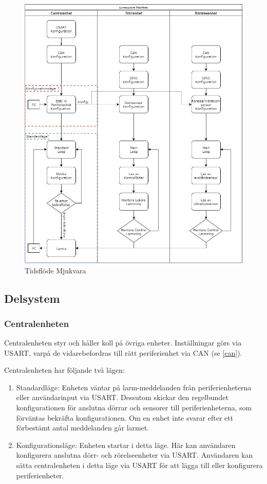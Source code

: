 \documentclass{article}
\begin{document}
\begin{figure}[H]
    \centering
    \includegraphics[width=1\textwidth]{figurer/TidsFlode.jpg}
    \caption{Tidsflöde Mjukvara}
    \label{fig:tidsflöde}
\end{figure}

\subsection{Delsystem }
\subsubsection{Centralenheten}
Centralenheten styr och håller koll på övriga enheter.
 Inställningar görs via USART, varpå de vidarebefordras till rätt periferienhet via CAN (se \ref{can}).

Centralenheten har följande två lägen:

\begin{enumerate}
    \item Standardläge: Enheten väntar på larm-meddelanden från periferienheterna eller användarinput via USART. Dessutom skickar den regelbundet  konfigurationen för anslutna dörrar och sensorer till periferienheterna, som förväntas bekräfta konfigurationen. Om en enhet inte svarar efter ett förbestämt antal meddelanden går larmet.
    \item Konfigurationsläge: Enheten startar i detta läge.
     Här kan användaren konfigurera anslutna dörr- och
 rörelseenheter via USART. Användaren kan sätta centralenheten
      i detta läge via USART för att lägga till eller konfigurera periferienheter.
\end{enumerate}
\end{document}
